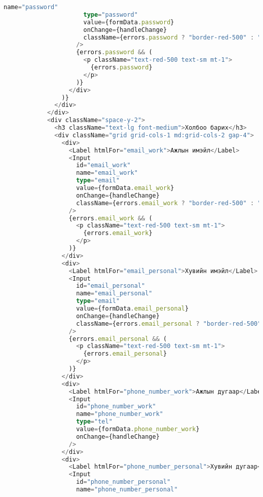\begin{lstlisting}[language=Typescript, caption=UI бүтэц, frame=single]
                      name="password"
                      type="password"
                      value={formData.password}
                      onChange={handleChange}
                      className={errors.password ? "border-red-500" : ""}
                    />
                    {errors.password && (
                      <p className="text-red-500 text-sm mt-1">
                        {errors.password}
                      </p>
                    )}
                  </div>
                )}
              </div>
            </div>
            <div className="space-y-2">
              <h3 className="text-lg font-medium">Холбоо барих</h3>
              <div className="grid grid-cols-1 md:grid-cols-2 gap-4">
                <div>
                  <Label htmlFor="email_work">Ажлын имэйл</Label>
                  <Input
                    id="email_work"
                    name="email_work"
                    type="email"
                    value={formData.email_work}
                    onChange={handleChange}
                    className={errors.email_work ? "border-red-500" : ""}
                  />
                  {errors.email_work && (
                    <p className="text-red-500 text-sm mt-1">
                      {errors.email_work}
                    </p>
                  )}
                </div>
                <div>
                  <Label htmlFor="email_personal">Хувийн имэйл</Label>
                  <Input
                    id="email_personal"
                    name="email_personal"
                    type="email"
                    value={formData.email_personal}
                    onChange={handleChange}
                    className={errors.email_personal ? "border-red-500" : ""}
                  />
                  {errors.email_personal && (
                    <p className="text-red-500 text-sm mt-1">
                      {errors.email_personal}
                    </p>
                  )}
                </div>
                <div>
                  <Label htmlFor="phone_number_work">Ажлын дугаар</Label>
                  <Input
                    id="phone_number_work"
                    name="phone_number_work"
                    type="tel"
                    value={formData.phone_number_work}
                    onChange={handleChange}
                  />
                </div>
                <div>
                  <Label htmlFor="phone_number_personal">Хувийн дугаар</Label>
                  <Input
                    id="phone_number_personal"
                    name="phone_number_personal"

\end{lstlisting}
